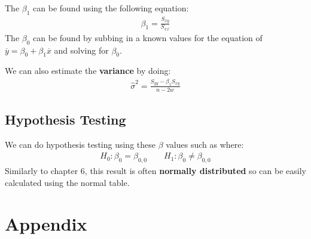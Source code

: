 \documentclass[12pt,letterpaper]{article} \usepackage{amsmath} \usepackage{graphicx} \usepackage[margin=1in]{geometry} \usepackage{longtable}  \usepackage{amssymb}
\begin{document}
	The $\beta_1$ can be found using the following equation:
	\begin{align*}
		\beta_1 = \frac{S_{xy}}{S_{xx}}
	\end{align*}
	The $\beta_0$ can be found by subbing in a known values for the equation of $\overline y = \beta_0 + \beta_1 \overline x$ and solving for $\beta_0$.
	
	We can also estimate the \textbf{variance} by doing:
	\begin{align*}
		\hat \sigma^2 = \frac{S_{yy} - \beta_1 S_{xy}}{n-2w}
	\end{align*}
	
	\subsection{Hypothesis Testing}
	We can do hypothesis testing using these $\beta$ values such as where:
	\begin{align*}
		H_0: \beta_0 = \beta_{0,0} \qquad H_1: \beta_0 \ne \beta_{0,0}
	\end{align*}
	Similarly to chapter 6, this result is often \textbf{normally distributed} so can be easily calculated using the normal table. 
	
	\newpage
	\section{Appendix}
\end{document}
